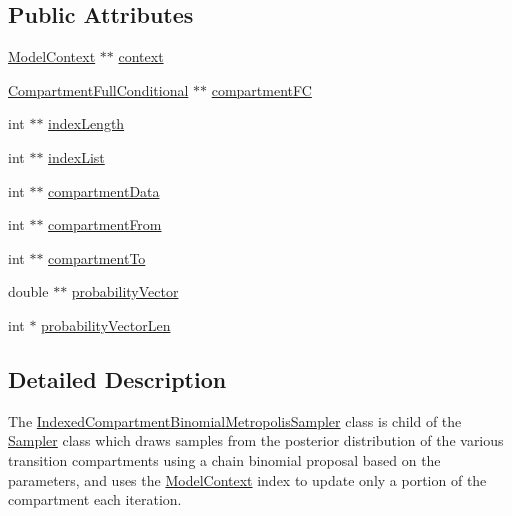 \subsection*{Public Attributes}
\begin{DoxyCompactItemize}
\item 
\hyperlink{classSpatialSEIR_1_1ModelContext}{Model\-Context} $\ast$$\ast$ \hyperlink{classSpatialSEIR_1_1IndexedCompartmentBinomialMetropolisSampler_afcc687d3efa75c24937e4bc809928268}{context}
\item 
\hyperlink{classSpatialSEIR_1_1CompartmentFullConditional}{Compartment\-Full\-Conditional} $\ast$$\ast$ \hyperlink{classSpatialSEIR_1_1IndexedCompartmentBinomialMetropolisSampler_ab0db99c76bbf5ffdc939771362a872f7}{compartment\-F\-C}
\item 
int $\ast$$\ast$ \hyperlink{classSpatialSEIR_1_1IndexedCompartmentBinomialMetropolisSampler_a8035e5cc93a9d3a9d66eb94d54362c7d}{index\-Length}
\item 
int $\ast$$\ast$ \hyperlink{classSpatialSEIR_1_1IndexedCompartmentBinomialMetropolisSampler_abbef44bf2436c1dec71cb6d7c521b0fe}{index\-List}
\item 
int $\ast$$\ast$ \hyperlink{classSpatialSEIR_1_1IndexedCompartmentBinomialMetropolisSampler_accf1b0fb600a417c513fea3a3d65ea5d}{compartment\-Data}
\item 
int $\ast$$\ast$ \hyperlink{classSpatialSEIR_1_1IndexedCompartmentBinomialMetropolisSampler_a915bf551d29852056a3638b00e9a9404}{compartment\-From}
\item 
int $\ast$$\ast$ \hyperlink{classSpatialSEIR_1_1IndexedCompartmentBinomialMetropolisSampler_a97302172c15506865073ef44548ce6b0}{compartment\-To}
\item 
double $\ast$$\ast$ \hyperlink{classSpatialSEIR_1_1IndexedCompartmentBinomialMetropolisSampler_a1c9a06458af46193bf5a1a55b7652d4d}{probability\-Vector}
\item 
int $\ast$ \hyperlink{classSpatialSEIR_1_1IndexedCompartmentBinomialMetropolisSampler_af27c6ad0b6dec9387e298751dea30504}{probability\-Vector\-Len}
\end{DoxyCompactItemize}


\subsection{Detailed Description}
The \hyperlink{classSpatialSEIR_1_1IndexedCompartmentBinomialMetropolisSampler}{Indexed\-Compartment\-Binomial\-Metropolis\-Sampler} class is child of the \hyperlink{classSpatialSEIR_1_1Sampler}{Sampler} class which draws samples from the posterior distribution of the various transition compartments using a chain binomial proposal based on the parameters, and uses the \hyperlink{classSpatialSEIR_1_1ModelContext}{Model\-Context} index to update only a portion of the compartment each iteration. 

